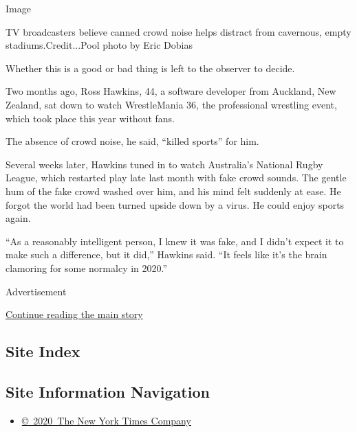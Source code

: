 Image

TV broadcasters believe canned crowd noise helps distract from
cavernous, empty stadiums.Credit...Pool photo by Eric Dobias

Whether this is a good or bad thing is left to the observer to decide.

Two months ago, Ross Hawkins, 44, a software developer from Auckland,
New Zealand, sat down to watch WrestleMania 36, the professional
wrestling event, which took place this year without fans.

The absence of crowd noise, he said, ``killed sports'' for him.

Several weeks later, Hawkins tuned in to watch Australia's National
Rugby League, which restarted play late last month with fake crowd
sounds. The gentle hum of the fake crowd washed over him, and his mind
felt suddenly at ease. He forgot the world had been turned upside down
by a virus. He could enjoy sports again.

``As a reasonably intelligent person, I knew it was fake, and I didn't
expect it to make such a difference, but it did,'' Hawkins said. ``It
feels like it's the brain clamoring for some normalcy in 2020.''

Advertisement

\protect\hyperlink{after-bottom}{Continue reading the main story}

\hypertarget{site-index}{%
\subsection{Site Index}\label{site-index}}

\hypertarget{site-information-navigation}{%
\subsection{Site Information
Navigation}\label{site-information-navigation}}

\begin{itemize}
\tightlist
\item
  \href{https://help.nytimes3xbfgragh.onion/hc/en-us/articles/115014792127-Copyright-notice}{©~2020~The
  New York Times Company}
\end{itemize}


